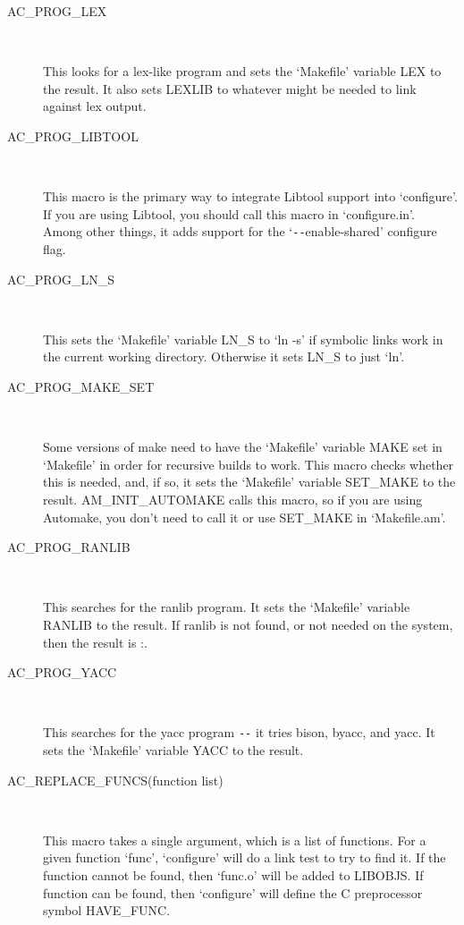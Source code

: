 \begin{description}
\item[AC\_{}PROG\_{}LEX]
\

    This looks for a lex-like program and sets the `Makefile' variable LEX to the result. It also sets LEXLIB to whatever might be needed to link against lex output.

\item[AC\_{}PROG\_{}LIBTOOL]
\

    This macro is the primary way to integrate Libtool support into `configure'. If you are using Libtool, you should call this macro in `configure.in'. Among other things, it adds support for the `\verb+--+enable-shared' configure flag.

\item[AC\_{}PROG\_{}LN\_{}S]
\

    This sets the `Makefile' variable LN\_{}S to `ln -s' if symbolic links work in the current working directory. Otherwise it sets LN\_{}S to just `ln'.

\item[AC\_{}PROG\_{}MAKE\_{}SET]
\

    Some versions of make need to have the `Makefile' variable MAKE set in `Makefile' in order for recursive builds to work. This macro checks whether this is needed, and, if so, it sets the `Makefile' variable SET\_{}MAKE to the result. AM\_{}INIT\_{}AUTOMAKE calls this macro, so if you are using Automake, you don't need to call it or use SET\_{}MAKE in `Makefile.am'.

\item[AC\_{}PROG\_{}RANLIB]
\

    This searches for the ranlib program. It sets the `Makefile' variable RANLIB to the result. If ranlib is not found, or not needed on the system, then the result is :.

\item[AC\_{}PROG\_{}YACC]
\

    This searches for the yacc program \verb+--+ it tries bison, byacc, and yacc. It sets the `Makefile' variable YACC to the result.

\item[AC\_{}REPLACE\_{}FUNCS(function list)]
\

    This macro takes a single argument, which is a list of functions. For a given function `func', `configure' will do a link test to try to find it. If the function cannot be found, then `func.o' will be added to LIBOBJS. If function can be found, then `configure' will define the C preprocessor symbol HAVE\_{}FUNC.


\end{description}
